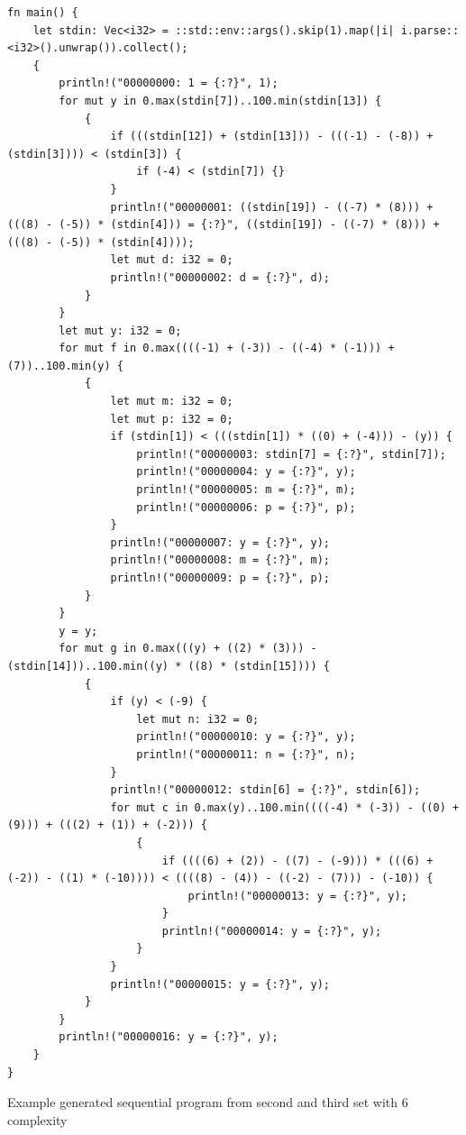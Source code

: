 \begin{code}
\begin{verbatim}
fn main() {
    let stdin: Vec<i32> = ::std::env::args().skip(1).map(|i| i.parse::<i32>().unwrap()).collect();
    {
        println!("00000000: 1 = {:?}", 1);
        for mut y in 0.max(stdin[7])..100.min(stdin[13]) {
            {
                if (((stdin[12]) + (stdin[13])) - (((-1) - (-8)) + (stdin[3]))) < (stdin[3]) {
                    if (-4) < (stdin[7]) {}
                }
                println!("00000001: ((stdin[19]) - ((-7) * (8))) + (((8) - (-5)) * (stdin[4])) = {:?}", ((stdin[19]) - ((-7) * (8))) + (((8) - (-5)) * (stdin[4])));
                let mut d: i32 = 0;
                println!("00000002: d = {:?}", d);
            }
        }
        let mut y: i32 = 0;
        for mut f in 0.max((((-1) + (-3)) - ((-4) * (-1))) + (7))..100.min(y) {
            {
                let mut m: i32 = 0;
                let mut p: i32 = 0;
                if (stdin[1]) < (((stdin[1]) * ((0) + (-4))) - (y)) {
                    println!("00000003: stdin[7] = {:?}", stdin[7]);
                    println!("00000004: y = {:?}", y);
                    println!("00000005: m = {:?}", m);
                    println!("00000006: p = {:?}", p);
                }
                println!("00000007: y = {:?}", y);
                println!("00000008: m = {:?}", m);
                println!("00000009: p = {:?}", p);
            }
        }
        y = y;
        for mut g in 0.max(((y) + ((2) * (3))) - (stdin[14]))..100.min((y) * ((8) * (stdin[15]))) {
            {
                if (y) < (-9) {
                    let mut n: i32 = 0;
                    println!("00000010: y = {:?}", y);
                    println!("00000011: n = {:?}", n);
                }
                println!("00000012: stdin[6] = {:?}", stdin[6]);
                for mut c in 0.max(y)..100.min((((-4) * (-3)) - ((0) + (9))) + (((2) + (1)) + (-2))) {
                    {
                        if ((((6) + (2)) - ((7) - (-9))) * (((6) + (-2)) - ((1) * (-10)))) < ((((8) - (4)) - ((-2) - (7))) - (-10)) {
                            println!("00000013: y = {:?}", y);
                        }
                        println!("00000014: y = {:?}", y);
                    }
                }
                println!("00000015: y = {:?}", y);
            }
        }
        println!("00000016: y = {:?}", y);
    }
}
\end{verbatim}
\caption{\label{code:genprogram2}Example generated sequential program from second and third set with $6$ complexity}
\end{code}

